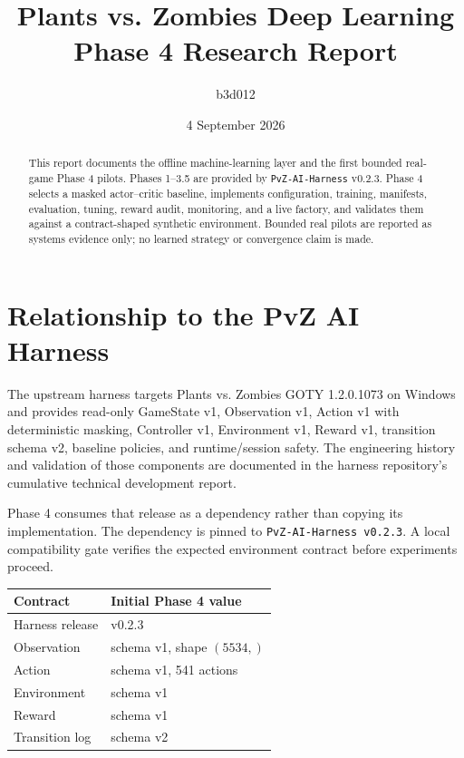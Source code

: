 \documentclass[11pt,a4paper]{article}
\title{\textbf{Plants vs. Zombies Deep Learning}\\\large Phase 4 Research Report}
\author{b3d012}
\date{4 September 2026}
\begin{document}
\maketitle

\begin{abstract}
This report documents the offline machine-learning layer and the first bounded
real-game Phase 4 pilots. Phases 1--3.5 are provided by
\texttt{PvZ-AI-Harness} v0.2.3. Phase 4 selects a masked actor--critic baseline,
implements configuration, training, manifests, evaluation, tuning, reward
audit, monitoring, and a live factory, and validates them against a
contract-shaped synthetic environment. Bounded real pilots are reported as
systems evidence only; no learned strategy or convergence claim is made.
\end{abstract}

\section{Relationship to the PvZ AI Harness}
The upstream harness targets Plants vs. Zombies GOTY 1.2.0.1073 on Windows and provides read-only GameState v1, Observation v1, Action v1 with deterministic masking, Controller v1, Environment v1, Reward v1, transition schema v2, baseline policies, and runtime/session safety. The engineering history and validation of those components are documented in the harness repository's cumulative technical development report.

Phase 4 consumes that release as a dependency rather than copying its implementation. The dependency is pinned to \texttt{PvZ-AI-Harness v0.2.3}. A local compatibility gate verifies the expected environment contract before experiments proceed.

\begin{center}
\begin{tabular}{ll}
\toprule
Contract & Initial Phase 4 value \\
\midrule
Harness release & v0.2.3 \\
Observation & schema v1, shape $(5534,)$ \\
Action & schema v1, 541 actions \\
Environment & schema v1 \\
Reward & schema v1 \\
Transition log & schema v2 \\
\bottomrule
\end{tabular}
\end{center}
\end{document}
